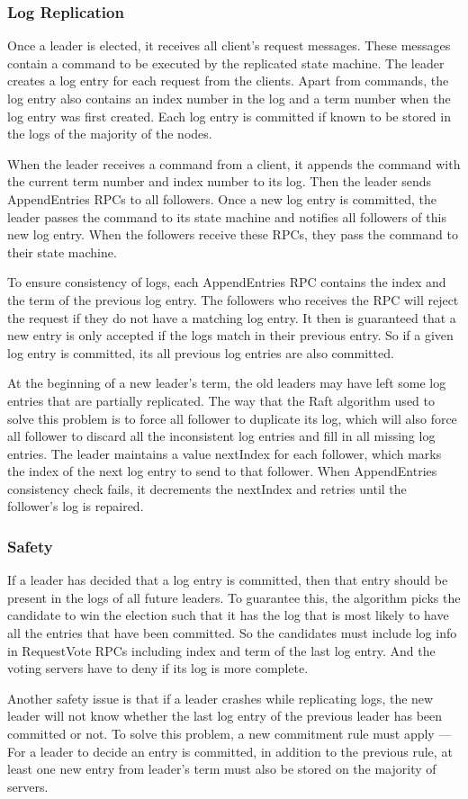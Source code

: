 \documentclass[12pt, a4paper]{article}
\begin{document}
  \subsubsection{Log Replication}
  Once a leader is elected, it receives all client's request messages. These messages contain a command to be executed by the replicated
  state machine. The leader creates a log entry for each request from the clients. Apart from commands, the log entry also contains an index
  number in the log and a term number when the log entry was first created. Each log entry is committed if known to be stored in the logs of
  the majority of the nodes.
  \par
  When the leader receives a command from a client, it appends the command with the current term number and index number to its log. Then the leader
  sends AppendEntries RPCs to all followers. Once a new log entry is committed, the leader passes the command to its state machine and
  notifies all followers of this new log entry. When the followers receive these RPCs, they pass the command to their state machine.
  \par
  To ensure consistency of logs, each AppendEntries RPC contains the index and the term of the previous log entry. The followers who receives the RPC will
  reject the request if they do not have a matching log entry. It then is guaranteed that a new entry is only accepted if the logs match in
  their previous entry. So if a given log entry is committed, its all previous log entries are also committed.
  \par
  At the beginning of a new leader's term, the old leaders may have left some log entries that are partially replicated. The way that the Raft
  algorithm used to solve this problem is to force all follower to duplicate its log, which will also force all follower to discard all the
  inconsistent log entries and fill in all missing log entries. The leader maintains a value nextIndex for each follower, which marks the index
  of the next log entry to send to that follower. When AppendEntries consistency check fails, it decrements the nextIndex and retries until the
  follower's log is repaired.
  \subsubsection{Safety}
  If a leader has decided that a log entry is committed, then that entry should be present in the logs of all future leaders. To guarantee this,
  the algorithm picks the candidate to win the election such that it has the log that is most likely to have all the entries that have been
  committed. So the candidates must include log info in RequestVote RPCs including index and term of the last log entry. And the voting servers
  have to deny if its log is more complete.
  \par
  Another safety issue is that if a leader crashes while replicating logs, the new leader will not know whether the last log entry of the
  previous leader has been committed or not. To solve this problem, a new commitment rule must apply --- For a leader to decide an entry
  is committed, in addition to the previous rule, at least one new entry from leader's term must also be stored on the majority of servers.
\end{document}
